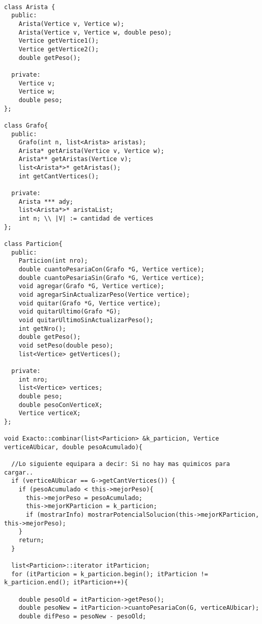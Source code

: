 \begin{lstlisting}

class Arista {
  public:
    Arista(Vertice v, Vertice w);
    Arista(Vertice v, Vertice w, double peso);
    Vertice getVertice1();
    Vertice getVertice2();
    double getPeso();

  private:
    Vertice v;
    Vertice w;
    double peso;
};

class Grafo{
  public:
    Grafo(int n, list<Arista> aristas);
    Arista* getArista(Vertice v, Vertice w);
    Arista** getAristas(Vertice v);
    list<Arista*>* getAristas();
    int getCantVertices();

  private:
    Arista *** ady;
    list<Arista*>* aristaList;
    int n; \\ |V| := cantidad de vertices 
};

class Particion{
  public:
    Particion(int nro);
    double cuantoPesariaCon(Grafo *G, Vertice vertice);
    double cuantoPesariaSin(Grafo *G, Vertice vertice);
    void agregar(Grafo *G, Vertice vertice);
    void agregarSinActualizarPeso(Vertice vertice);
    void quitar(Grafo *G, Vertice vertice);
    void quitarUltimo(Grafo *G);
    void quitarUltimoSinActualizarPeso();
    int getNro();
    double getPeso();
    void setPeso(double peso);
    list<Vertice> getVertices();

  private:
    int nro;
    list<Vertice> vertices;
    double peso;
    double pesoConVerticeX;
    Vertice verticeX;
};

void Exacto::combinar(list<Particion> &k_particion, Vertice verticeAUbicar, double pesoAcumulado){

  //Lo siguiente equipara a decir: Si no hay mas quimicos para cargar..
  if (verticeAUbicar == G->getCantVertices()) {
    if (pesoAcumulado < this->mejorPeso){
      this->mejorPeso = pesoAcumulado;
      this->mejorKParticion = k_particion;
      if (mostrarInfo) mostrarPotencialSolucion(this->mejorKParticion, this->mejorPeso);
    }
    return;
  }

  list<Particion>::iterator itParticion;
  for (itParticion = k_particion.begin(); itParticion != k_particion.end(); itParticion++){

    double pesoOld = itParticion->getPeso();
    double pesoNew = itParticion->cuantoPesariaCon(G, verticeAUbicar);
    double difPeso = pesoNew - pesoOld;


\end{lstlisting}
